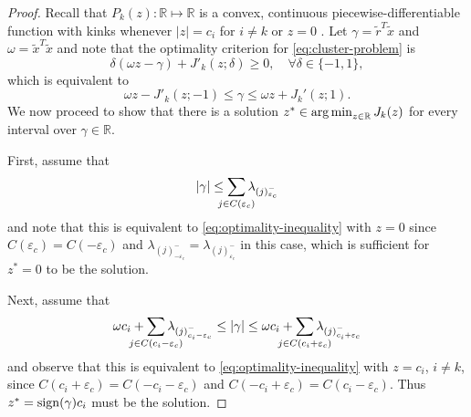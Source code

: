 \begin{proof}
  Recall that \(P_k(z) : \mathbb{R} \mapsto \mathbb{R}\) is a convex,
  continuous piecewise-differentiable function with kinks whenever \(|z| =
  c_i\) for \(i \neq k\) or \(z = 0\) . Let \(\gamma = \tilde{r}^T\tilde{x}\)
  and \(\omega = \tilde{x}^T\tilde{x}\) and note that the optimality criterion for
  \eqref{eq:cluster-problem} is
  \[
    \delta(\omega z - \gamma) + J'_k(z; \delta) \geq 0, \quad
    \forall \delta \in \{-1, 1\},
  \]
  which is equivalent to
  \begin{equation}
    \label{eq:optimality-inequality}
    \omega z - J'_k(z; -1) \leq \gamma \leq \omega z + J_k'(z; 1).
  \end{equation}
  We now proceed to show that there is a solution \(z^* \in \operatorname*{arg\,min}_{z \in
    \mathbb{R}} J_k(z)\) for every interval over \(\gamma \in \mathbb{R}\).

  First, assume that
  \begin{equation}
    \label{eq:case-zero}
    |\gamma| \leq \smashoperator{\sum_{j \in C({\varepsilon_c})}}\lambda_{(j)^-_{{\varepsilon_c}}}
  \end{equation}
  and note that this is equivalent to \eqref{eq:optimality-inequality} with \(z
  = 0\) since \(C({\varepsilon_c}) = C(-{\varepsilon_c})\) and
  \(\lambda_{(j)^-_{-{\varepsilon_c}}} = \lambda_{(j)^-_{{\varepsilon_c}}}\) in
  this case, which is sufficient for \(z^* = 0\) to be the solution.

  Next, assume that
  \begin{equation}
    \label{eq:case-cluster}
    \omega c_i + \smashoperator{\sum_{j \in C(c_i - {\varepsilon_c})}} \lambda_{(j)^-_{c_i - {\varepsilon_c}}}
    \leq |\gamma| \leq
    \omega c_i + \smashoperator{\sum_{j \in C(c_i + {\varepsilon_c})}} \lambda_{(j)^-_{c_i + {\varepsilon_c}}}
  \end{equation}
  and observe that this is equivalent to \eqref{eq:optimality-inequality} with
  \(z = c_i\), \(i \neq k\), since
  \(C(c_i + {\varepsilon_c}) = C(-c_i - {\varepsilon_c})\) and
  \(C(-c_i + {\varepsilon_c}) = C(c_i - {\varepsilon_c})\). Thus \(z^* = \operatorname{sign}(\gamma)c_i\) must be
  the solution.


\end{proof}
